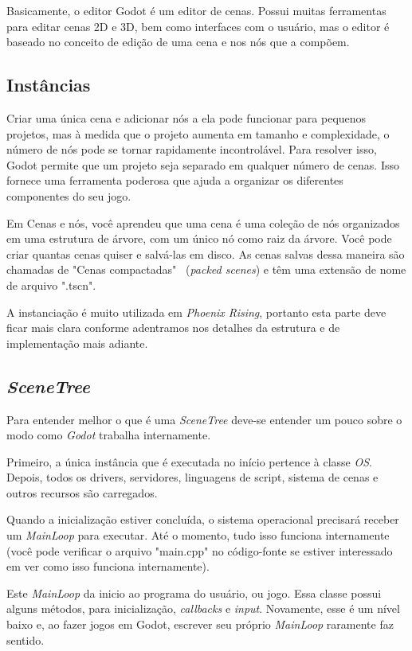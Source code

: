 Basicamente, o editor Godot é um editor de cenas. Possui muitas ferramentas para
editar cenas 2D e 3D, bem como interfaces com o usuário, mas o editor é baseado 
no conceito de edição de uma cena e nos nós que a compõem.

\subsection{Instâncias}

Criar uma única cena e adicionar nós a ela pode funcionar para pequenos 
projetos, mas à medida que o projeto aumenta em tamanho e complexidade, o número
de nós pode se tornar rapidamente incontrolável. Para resolver isso, Godot 
permite que um projeto seja separado em qualquer número de cenas. Isso fornece 
uma ferramenta poderosa que ajuda a organizar os diferentes componentes do seu
jogo.

Em Cenas e nós, você aprendeu que uma cena é uma coleção de nós organizados em 
uma estrutura de árvore, com um único nó como raiz da árvore.
Você pode criar quantas cenas quiser e salvá-las em disco. As cenas salvas dessa
maneira são chamadas de "Cenas compactadas" \ (\textit{packed scenes}) e têm uma 
extensão de nome de arquivo ".tscn".

A instanciação é muito utilizada em \textit{Phoenix Rising}, portanto esta
parte deve ficar mais clara conforme adentramos nos detalhes da estrutura e
de implementação mais adiante.

\subsection{\textit{SceneTree}}

Para entender melhor o que é uma \textit{SceneTree} deve-se entender um pouco 
sobre o modo como \textit{Godot} trabalha internamente.

Primeiro, a única instância que é executada no 
início pertence à classe \textit{OS}. Depois, todos os drivers, servidores,
linguagens de script, sistema de cenas e outros recursos são carregados.

Quando a inicialização estiver concluída, o sistema operacional precisará 
receber um \textit{MainLoop} para executar. Até o momento, tudo isso funciona 
internamente (você pode verificar o arquivo "main.cpp" no código-fonte se 
estiver interessado em ver como isso funciona internamente).

Este \textit{MainLoop} da inicio ao programa do usuário, ou jogo. Essa classe
possui alguns métodos, para inicialização, \textit{callbacks} e \textit{input}. 
Novamente, esse é um nível baixo e, ao fazer jogos em Godot, escrever seu 
próprio \textit{MainLoop} raramente faz sentido.

